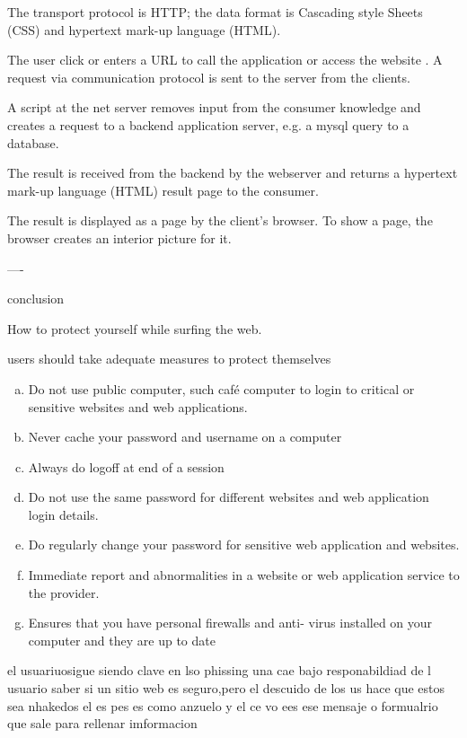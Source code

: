\documentclass[12pt]{article}
\begin{document}
 The transport
protocol is HTTP; the data format is Cascading style Sheets
(CSS) and hypertext mark-up language (HTML). 

The user
click or enters a URL to call the application or access the website .
 A request via communication protocol is sent to
the server from the clients. 

A script at the net server removes
input from the consumer knowledge and creates a request to a backend application server, e.g. a mysql query to a database.

The result is received from the backend by the webserver and
returns a hypertext mark-up language (HTML) result page to the consumer. 

The result is displayed as a page by the client’s
browser. 
To show a page, the browser creates an interior
picture for it. 

----

conclusion 

How to protect yourself while surfing the web.

users should take adequate measures to protect
themselves

\begin{enumerate}[(a)]

\item  Do not use public computer, such café computer to
login to critical or sensitive websites and web
applications.
\item  Never cache your password and username on a
computer

\item Always do logoff at end of a session
\item Do  not use the same password for different
websites and web application login details.

\item  Do regularly change your password for sensitive
web application and websites.

\item Immediate report and abnormalities in a website or
web application service to the provider.

\item Ensures that you have personal firewalls and anti-
virus installed on your computer and they are up to
date
\end{enumerate}


el usuariuosigue siendo clave en lso phissing una 
cae bajo responabildiad de l usuario saber si un sitio web es seguro,pero el descuido de los us hace que estos sea nhakedos 
el es pes es como anzuelo y el ce vo ees ese mensaje o formualrio que sale para rellenar imformacion
\end{document}
